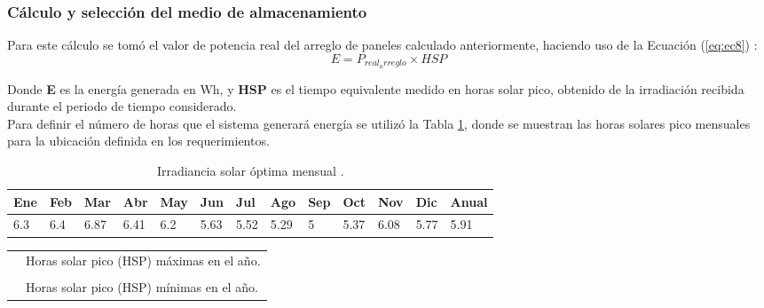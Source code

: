 \subsubsection{Cálculo y selección del medio de almacenamiento} \label{sec:baterias}
Para este cálculo se tomó el valor de potencia real del arreglo de paneles calculado anteriormente, haciendo uso de la Ecuación (\ref{eq:ec8}) \cite{DDE2}: 
\begin{equation}\label{eq:ec8}
E = P_{real_arreglo} \times HSP   
\end{equation}

Donde \textbf{E} es la energía generada en Wh, y \textbf{HSP} es el tiempo equivalente medido en horas solar pico, obtenido de la irradiación recibida durante el periodo de tiempo considerado.\\

Para definir el número de horas que el sistema generará energía se utilizó la Tabla \ref{tab:irra}, donde se muestran las horas solares pico mensuales para la ubicación definida en los requerimientos.  

\begin{table}[H]
	\centering
	\caption{Irradiancia solar óptima mensual \cite{DDE3}.}
	\begin{tabular}{|p{1.4em}|p{1.3em}|p{1.7em}|p{1.7em}|p{1.7em}|p{1.5em}|p{1.3em}|p{1.7em}|p{1.5em}|p{1.5em}|p{1.7em}|p{1.5em}|p{2.7em}|}
		\hline
		\textbf{Ene} & \textbf{Feb} & \textbf{Mar} & \textbf{Abr} & \textbf{May} & \textbf{Jun} & \textbf{Jul} & \textbf{Ago} & \textbf{Sep} & \textbf{Oct} & \textbf{Nov} & \textbf{Dic} & \textbf{Anual} \\
		\hline
		6.3   & 6.4   & \cellcolor[rgb]{ 1,  .2,  .6}6.87 & 6.41  & 6.2   & 5.63  & 5.52  & 5.29  & \cellcolor[rgb]{ .2,  .4,  1}5 & 5.37  & 6.08  & 5.77  & 5.91 \\
		\hline
	\end{tabular}%
	\label{tab:irra}%
\end{table}%

\begin{table}[H]
	\begin{tabular}{cl}
		\rowcolor[rgb]{ 1,  .2,  .6}       & \cellcolor[rgb]{ 1,  1,  1}Horas solar pico (HSP) máximas en el año. \\
		&  \\
		\rowcolor[rgb]{ .2,  .4,  1}       & \cellcolor[rgb]{ 1,  1,  1}Horas solar pico (HSP) mínimas en el año. \\
	\end{tabular}%
\end{table}%

